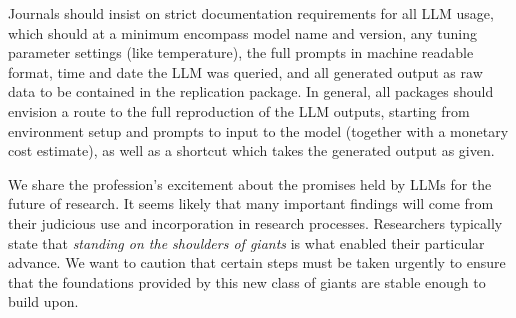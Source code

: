 \documentclass[11pt]{article}
\begin{document}
Journals should insist on strict documentation requirements for all LLM usage, which should at a minimum encompass model name and version, any tuning parameter settings (like temperature), the full prompts in machine readable format, time and date the LLM was queried, and all generated output as raw data to be contained in the replication package. In general, all packages should envision a route to the full reproduction of the LLM outputs, starting from environment setup and prompts to input to the model (together with a monetary cost estimate), as well as a shortcut which takes the generated output as given.
\medskip

We share the profession's excitement about the promises held by LLMs for the future of research. It seems likely that many important findings will come from their judicious use and incorporation in research processes. Researchers typically state that \textit{standing on the shoulders of giants} is what enabled their particular advance. We want to caution that certain steps must be taken urgently to ensure that the foundations provided by this new class of giants are stable enough to build upon.



\end{document}
